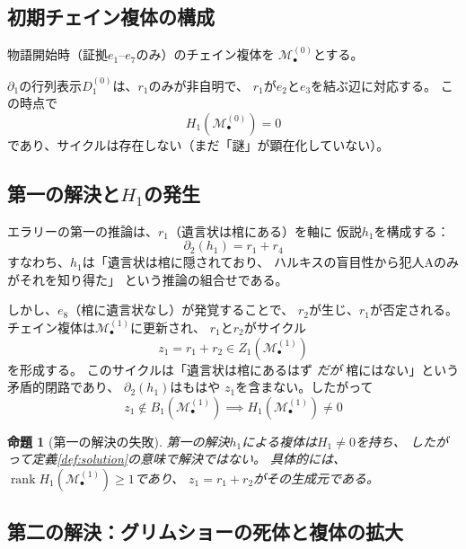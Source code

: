 \documentclass[12pt,twocolumn]{ltjsarticle}
\newtheorem{proposition}[theorem]{命題}
\renewcommand{\rank}{\operatorname{rank}}
\newcommand{\Mys}{\mathcal{M}}
\begin{document}
\subsection{初期チェイン複体の構成}

物語開始時（証拠$e_1$--$e_7$のみ）のチェイン複体を
$\Mys^{(0)}_\bullet$とする。

$\partial_1$の行列表示$D_1^{(0)}$は、$r_1$のみが非自明で、
$r_1$が$e_2$と$e_3$を結ぶ辺に対応する。
この時点で
\begin{equation}
H_1(\Mys^{(0)}_\bullet) = 0
\end{equation}
であり、サイクルは存在しない（まだ「謎」が顕在化していない）。

\subsection{第一の解決と$H_1$の発生}

エラリーの第一の推論は、$r_1$（遺言状は棺にある）を軸に
仮説$h_1$を構成する：
\begin{equation}
\partial_2(h_1) = r_1 + r_4
\end{equation}
すなわち、$h_1$は「遺言状は棺に隠されており、
ハルキスの盲目性から犯人Aのみがそれを知り得た」
という推論の組合せである。

しかし、$e_8$（棺に遺言状なし）が発覚することで、
$r_2$が生じ、$r_1$が否定される。
チェイン複体は$\Mys^{(1)}_\bullet$に更新され、
$r_1$と$r_2$がサイクル
\begin{equation}
z_1 = r_1 + r_2 \in Z_1(\Mys^{(1)}_\bullet)
\end{equation}
を形成する。
このサイクルは「遺言状は棺にあるはず \emph{だが}
棺にはない」という矛盾的閉路であり、
$\partial_2(h_1)$はもはや
$z_1$を含まない。したがって
\begin{equation}
z_1 \notin B_1(\Mys^{(1)}_\bullet)
\implies H_1(\Mys^{(1)}_\bullet) \neq 0
\end{equation}

\begin{proposition}[第一の解決の失敗]
\label{prop:first_failure}
第一の解決$h_1$による複体は$H_1 \neq 0$を持ち、
したがって定義\ref{def:solution}の意味で解決ではない。
具体的には、$\rank H_1(\Mys^{(1)}_\bullet) \geq 1$であり、
$z_1 = r_1 + r_2$がその生成元である。
\end{proposition}

\subsection{第二の解決：グリムショーの死体と複体の拡大}
\end{document}

